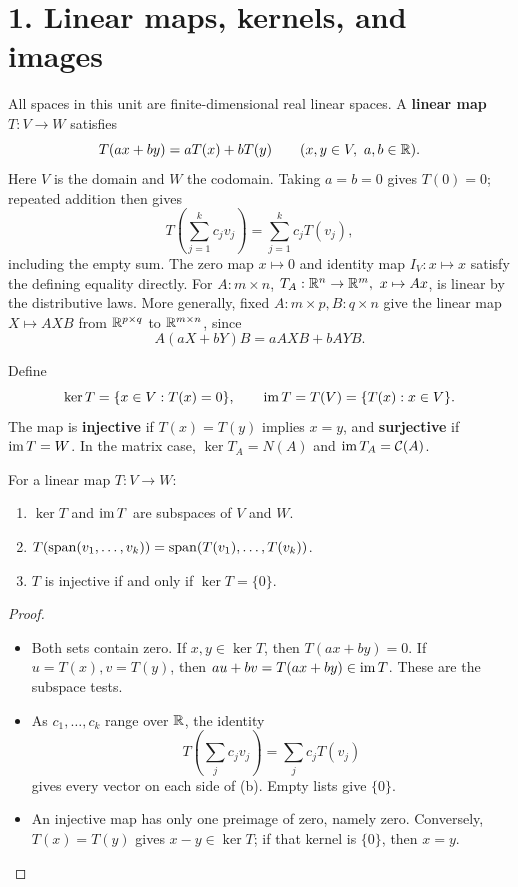 \section*{1. Linear maps, kernels, and images}

All spaces in this unit are finite-dimensional real
linear spaces. A \textbf{linear map} \(T:V\to W\) satisfies
\[
T(ax+by)=aT(x)+bT(y)\qquad(x,y\in V,\ a,b\in\mathbb R).
\]
Here \(V\) is the domain and \(W\) the codomain. Taking \(a=b=0\)
gives \(T(0)=0\); repeated addition then gives
\[
T\left(\sum_{j=1}^k c_jv_j\right)=\sum_{j=1}^k c_jT(v_j),
\]
including the empty sum. The zero map \(x\mapsto0\) and identity map
\(I_V:x\mapsto x\) satisfy the defining equality directly.
For \(A:m\times n\), \(T_A:\mathbb R^n\to\mathbb R^m,\ x\mapsto Ax\), is linear by
the distributive laws. More generally, fixed \(A:m\times p,B:q\times n\) give
the linear map \(X\mapsto AXB\) from \(\mathbb R^{p\times q}\) to \(\mathbb R^{m\times n}\), since
\[
A(aX+bY)B=aAXB+bAYB.
\]

Define
\[
\ker T=\{x\in V:T(x)=0\},\qquad
\operatorname{im} T=T(V)=\{T(x):x\in V\}.
\]
The map is \textbf{injective} if \(T(x)=T(y)\) implies \(x=y\), and
\textbf{surjective} if \(\operatorname{im} T=W\). In the matrix case,
\(\ker T_A=N(A)\) and \(\operatorname{im} T_A=\mathcal C(A)\).

\begin{proposition}\label{prop:04:basic}
For a linear map \(T:V\to W\):
\begin{enumerate}
\item \(\ker T\) and \(\operatorname{im} T\) are subspaces of \(V\) and \(W\).
\item \(T(\operatorname{span}(v_1,\ldots,v_k))=\operatorname{span}(T(v_1),\ldots,T(v_k))\).
\item \(T\) is injective if and only if \(\ker T=\{0\}\).
\end{enumerate}
\end{proposition}
\begin{proof}
\begin{itemize}
\item Both sets contain zero. If \(x,y\in\ker T\), then
  \(T(ax+by)=0\). If \(u=T(x),v=T(y)\), then
  \(au+bv=T(ax+by)\in\operatorname{im} T\). These are the subspace tests.
\item As \(c_1,\ldots,c_k\) range over \(\mathbb R\), the identity
  \[
  T\left(\sum_jc_jv_j\right)=\sum_jc_jT(v_j)
  \]
  gives every vector on each side of (b). Empty lists give \(\{0\}\).
\item An injective map has only one preimage of zero, namely zero.
  Conversely, \(T(x)=T(y)\) gives \(x-y\in\ker T\);
  if that kernel is \(\{0\}\), then \(x=y\).
\end{itemize}
\end{proof}

